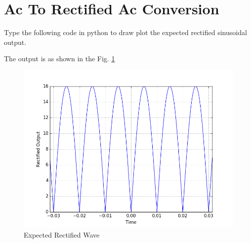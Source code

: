 \documentclass[journal,12pt,twocolumn]{IEEEtran}
\begin{document}
\section{Ac To Rectified Ac Conversion}
\begin{problem}
Type the following code in python to draw plot the expected rectified sinusoidal output.
\end{problem}

\solution
The output is as shown in the Fig. \ref{recex}

\begin{figure}[h]
\centering
	\includegraphics[scale=0.4]{./figs/expectedrectified.png}
	\caption{Expected Rectified Wave}  \label{recex}
    \end{figure}
\end{document}
